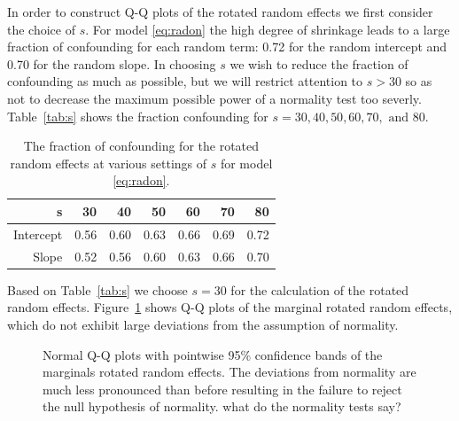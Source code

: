 \documentclass[12pt]{article} %
\newcommand{\hh}[1]{{\color{orange} #1}}
\newcommand{\al}[1]{{\color{red} #1}}
\begin{document}
In order to construct Q-Q plots of the rotated random effects we first consider the choice of $s$. For model \eqref{eq:radon} the high degree of shrinkage leads to a large fraction of confounding for each random term: 0.72 for the random intercept and 0.70 for the random slope. In choosing $s$ we wish to reduce the fraction of confounding \al{as much as possible}, but we will restrict attention to $s > 30$ so as not to decrease the maximum possible power of a normality test too severly. Table~\eqref{tab:s} shows the fraction confounding for $s = 30, 40, 50, 60, 70, \text{ and } 80$. 
%
\begin{table}[ht]
\centering
\caption{\label{tab:s} The fraction of confounding for the rotated random effects at various settings of $s$ for model \eqref{eq:radon}.}
\begin{tabular}{rrrrrrr}
  \hline
  s         & 30 & 40 & 50 & 60 & 70 & 80 \\ \hline
  Intercept & 0.56 & 0.60 & 0.63 & 0.66 & 0.69 & 0.72 \\ 
  Slope     & 0.52 & 0.56 & 0.60 & 0.63 & 0.66 & 0.70 \\ 
   \hline
\end{tabular}
\end{table}
%
Based on  Table~\eqref{tab:s} we choose $s=30$ for the calculation of the rotated random effects. Figure~\ref{fig:rotate-radon} shows Q-Q plots of the marginal rotated random effects, which do not exhibit large deviations from the assumption of normality.



\begin{figure}[htb]
	\centering
	\caption{\label{fig:rotate-radon} Normal Q-Q plots with pointwise 95\% confidence bands of the marginals rotated random effects. The deviations from normality are much less pronounced than before resulting in the failure to reject the null hypothesis of normality. \hh{what do the normality tests say?}}
\end{figure}
\end{document}
